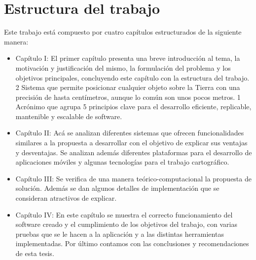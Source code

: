 \section{Estructura del trabajo}
Este trabajo está compuesto por cuatro capítulos estructurados de la siguiente
manera:
\begin{itemize}
    \item Capítulo I: El primer capítulo presenta una breve introducción al tema, la
          motivación y justificación del mismo, la formulación del problema y los objetivos
          principales, concluyendo este capítulo con la estructura del trabajo.
          2 Sistema que permite posicionar cualquier objeto sobre la Tierra con una precisión de hasta
          centímetros, aunque lo común son unos pocos metros.
          1 Acrónimo que agrupa 5 principios clave para el desarrollo eficiente, replicable, mantenible y
          escalable de software.
    \item Capítulo II: Acá se analizan diferentes sistemas que ofrecen funcionalidades
          similares a la propuesta a desarrollar con el objetivo de explicar sus ventajas y
          desventajas. Se analizan además diferentes plataformas para el desarrollo de
          aplicaciones móviles y algunas tecnologías para el trabajo cartográfico.
    \item Capítulo III: Se verifica de una manera teórico-computacional la propuesta de
          solución. Además se dan algunos detalles de implementación que se consideran
          atractivos de explicar.
    \item Capítulo IV: En este capítulo se muestra el correcto funcionamiento del software
          creado y el cumplimiento de los objetivos del trabajo, con varias pruebas que se le
          hacen a la aplicación y a las distintas herramientas implementadas. Por último
          contamos con las conclusiones y recomendaciones de esta tesis.
\end{itemize}

